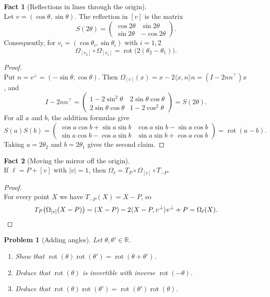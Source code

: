 \documentclass[11pt,a4paper]{article}
\theoremstyle{boxed}
\newtheorem{problem}{Problem}
\theoremstyle{definition}
\newtheorem{fact}{Fact}
\newcommand{\R}{\mathbb{R}}
\newcommand{\ip}[2]{\langle #1, #2 \rangle}
\newcommand{\abs}[1]{\lvert #1 \rvert}
\DeclareMathOperator{\rot}{rot}
\begin{document}
\begin{fact}[Reflections in lines through the origin]\label{f:matrix}
\leavevmode\\
Let $v=(\cos\theta,\sin\theta)$. The reflection in $[v]$ is the matrix
\[
S(2\theta)=\begin{pmatrix}\cos2\theta & \sin2\theta\\ \sin2\theta & -\cos2\theta\end{pmatrix}.
\]
Consequently, for $v_i=(\cos\theta_i,\sin\theta_i)$ with $i=1,2$
\[
\Omega_{[v_2]}\circ\Omega_{[v_1]}=\rot\bigl(2(\theta_2-\theta_1)\bigr).
\]
\end{fact}

\begin{proof}
\leavevmode\\
Put $n=v^\perp=(-\sin\theta,\cos\theta)$. Then $\Omega_{[v]}(x)=x-2\ip{x}{n}n=(I-2nn^{\top})x$, and
\[
I-2nn^{\top}=\begin{pmatrix}1-2\sin^2\theta & 2\sin\theta\cos\theta\\ 2\sin\theta\cos\theta & 1-2\cos^2\theta\end{pmatrix}=S(2\theta).
\]
For all $a$ and $b$, the addition formulas give
\[
S(a)S(b)=\begin{pmatrix}\cos a\cos b+\sin a\sin b & \cos a\sin b-\sin a\cos b\\ \sin a\cos b-\cos a\sin b & \sin a\sin b+\cos a\cos b\end{pmatrix}=\rot(a-b).
\]
Taking $a=2\theta_2$ and $b=2\theta_1$ gives the second claim.
\end{proof}

\begin{fact}[Moving the mirror off the origin]\label{f:conjugate}
\leavevmode\\
If $\ell=P+[v]$ with $\abs{v}=1$, then $\Omega_\ell=T_P\circ\Omega_{[v]}\circ T_{-P}$.
\end{fact}

\begin{proof}
\leavevmode\\
For every point $X$ we have $T_{-P}(X)=X-P$, so
\[
T_P\bigl(\Omega_{[v]}(X-P)\bigr)=(X-P)-2\ip{X-P}{v^\perp}v^\perp+P=\Omega_\ell(X). \qedhere
\]
\end{proof}

\begin{problem}[Adding angles]\label{p:addition}
Let $\theta,\theta'\in\R$.
\begin{enumerate}
    \item Show that $\rot(\theta)\rot(\theta')=\rot(\theta+\theta')$.
    \item Deduce that $\rot(\theta)$ is invertible with inverse $\rot(-\theta)$.
    \item Deduce that $\rot(\theta)\rot(\theta')=\rot(\theta')\rot(\theta)$.
\end{enumerate}
\end{problem}
\end{document}
